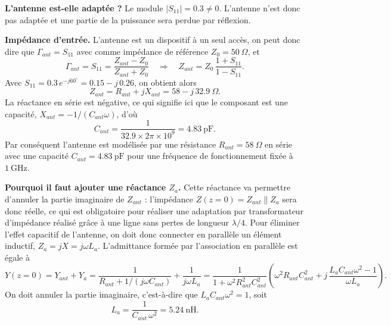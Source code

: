 \begin{example}[Antenne à $1\ \mathrm{GHz}$, $S_{11} = 0.3\,e^{-j60^{\circ}}$, $Z_0 = 50\ \Omega$]
  \textbf{L'antenne est-elle adaptée ?} Le module $|S_{11}| = 0.3 \neq 0$. L'antenne
  n'est donc pas adaptée et une partie de la puissance sera perdue par réflexion.

  \medskip
  \textbf{Impédance d'entrée.} L'antenne est un dispositif à un seul accès, on peut
  donc dire que $\Gamma_{ant} = S_{11}$ avec comme impédance de référence
  $Z_0 = 50\ \Omega$, et
  \[\Gamma_{ant} = S_{11} = \frac{Z_{ant} - Z_0}{Z_{ant} + Z_0}
    \quad\Longrightarrow\quad
    Z_{ant} = Z_0\,\frac{1 + S_{11}}{1 - S_{11}}.\]
  Avec $S_{11} = 0.3\,e^{-j60^{\circ}} = 0.15 - j\,0.26$, on obtient alors
  \[Z_{ant} = R_{ant} + j X_{ant} = 58 - j\,32.9\ \Omega.\]
  La réactance en série est négative, ce qui signifie ici que le composant est une
  capacité, $X_{ant} = -1/(C_{ant}\omega)$, d'où
  \[C_{ant} = \frac{1}{32.9 \times 2\pi \times 10^{9}} = 4.83\ \mathrm{pF}.\]
  Par conséquent l'antenne est modélisée par une résistance $R_{ant} = 58\ \Omega$ en
  série avec une capacité $C_{ant} = 4.83\ \mathrm{pF}$ pour une fréquence de
  fonctionnement fixée à $1\ \mathrm{GHz}$.

  \medskip
  \textbf{Pourquoi il faut ajouter une réactance $Z_a$.} Cette réactance va permettre
  d'annuler la partie imaginaire de $Z_{ant}$ : l'impédance
  $Z(z=0) = Z_{ant} \parallel Z_a$ sera donc réelle, ce qui est obligatoire pour
  réaliser une adaptation par transformateur d'impédance réalisé grâce à une ligne sans
  pertes de longueur $\lambda/4$. Pour éliminer l'effet capacitif de l'antenne, on doit
  donc connecter en parallèle un élément inductif, $Z_a = jX = j\omega L_a$.
  L'admittance formée par l'association en parallèle est égale à
  \[Y(z=0) = Y_{ant} + Y_a
    = \frac{1}{R_{ant} + 1/(j\omega C_{ant})} + \frac{1}{j\omega L_a}
    = \frac{1}{1 + \omega^2 R_{ant}^2 C_{ant}^2}
      \left(\omega^2 R_{ant} C_{ant}^2
        + j\,\frac{L_a C_{ant}\omega^2 - 1}{\omega L_a}\right).\]
  On doit annuler la partie imaginaire, c'est-à-dire que $L_a C_{ant}\omega^2 = 1$,
  soit
  \[L_a = \frac{1}{C_{ant}\,\omega^2} = 5.24\ \mathrm{nH}.\]


\end{example}
